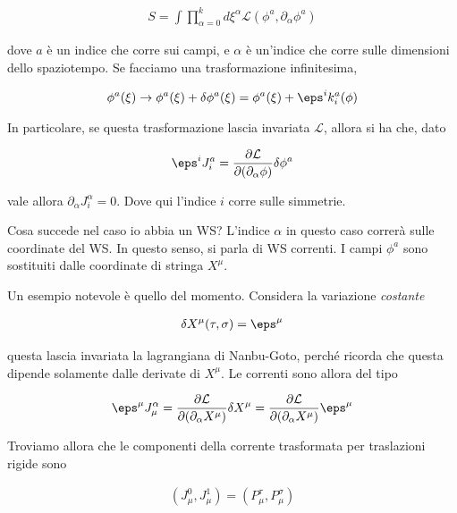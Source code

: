 \documentclass{report}
\begin{document}
\begin{align}
    S = \int \prod_{\alpha =0}^k d\xi^\alpha \mathcal{L}(\phi^a, \partial_\alpha \phi^a)
\end{align}

dove \(a\) è un indice che corre sui campi, e \(\alpha\) è un'indice che corre sulle dimensioni dello spaziotempo. Se facciamo una trasformazione infinitesima, 

\begin{align}
    \phi^a(\xi) \rightarrow \phi^a(\xi) + \delta\phi^a(\xi) = \phi^a(\xi) + \eps^i k^a_i (\phi)
\end{align}

In particolare, se questa trasformazione lascia invariata \(\mathcal{L}\), allora si ha che, dato 

\begin{align}
    \eps^iJ_i^a = \frac{\partial\mathcal{L}}{\partial(\partial_\alpha\phi)}\delta\phi^a
\end{align}

vale allora \(\partial_\alpha J^\alpha_i = 0\). Dove qui l'indice \(i\) corre sulle simmetrie. 

Cosa succede nel caso io abbia un WS? L'indice \(\alpha\) in questo caso correrà sulle coordinate del WS. In questo senso, si parla di WS correnti. I campi \(\phi^a\) sono sostituiti dalle coordinate di stringa \(X^\mu\). 

Un esempio notevole è quello del momento. Considera la variazione \emph{costante} 

\begin{align}
    \delta X^\mu (\tau,\sigma) = \eps^\mu
\end{align}

questa lascia invariata la lagrangiana di Nanbu-Goto, perché ricorda che questa dipende solamente dalle derivate di \(X^\mu\). Le correnti sono allora del tipo 

\begin{align}
    \eps^\mu J^\alpha_\mu = \frac{\partial \mathcal{L}}{\partial (\partial_\alpha X^\mu)}\delta X^\mu = \frac{\partial \mathcal{L}}{\partial (\partial_\alpha X^\mu)} \eps^\mu 
\end{align}

Troviamo allora che le componenti della corrente trasformata per traslazioni rigide sono 

\begin{align}
    (J_\mu^0, J_\mu^1) = (P_\mu^\tau, P_\mu^\sigma)
\end{align}
\end{document}
